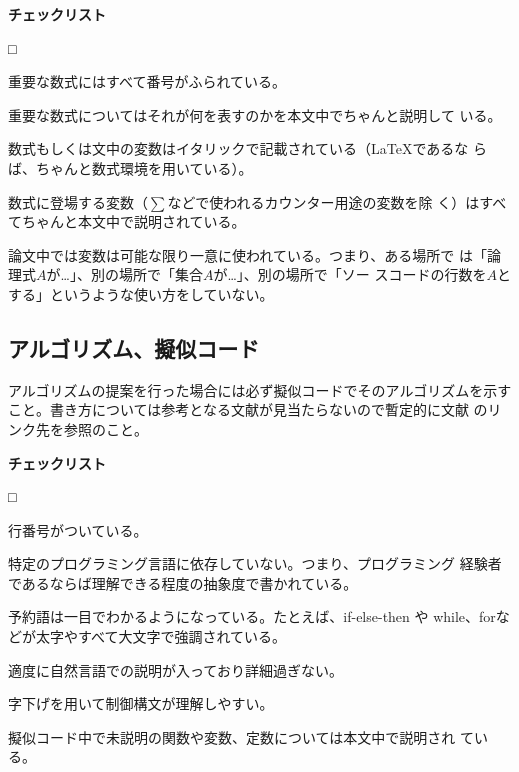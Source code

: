\documentclass[11pt,a4j]{jsarticle}
\begin{document}
\begin{flushleft}
 {\bf チェックリスト}
\end{flushleft}
\begin{list}%
 {□} %
 {} %
 \item 重要な数式にはすべて番号がふられている。
 \item 重要な数式についてはそれが何を表すのかを本文中でちゃんと説明して
       いる。
 \item 数式もしくは文中の変数はイタリックで記載されている（LaTeXであるな
       らば、ちゃんと数式環境を用いている）。
 \item 数式に登場する変数（$\sum$などで使われるカウンター用途の変数を除
       く）はすべてちゃんと本文中で説明されている。
 \item 論文中では変数は可能な限り一意に使われている。つまり、ある場所で
       は「論理式$A$が…」、別の場所で「集合$A$が…」、別の場所で「ソー
       スコードの行数を$A$とする」というような使い方をしていない。
 
\end{list}

\subsection{アルゴリズム、擬似コード}

アルゴリズムの提案を行った場合には必ず擬似コードでそのアルゴリズムを示す
こと。書き方については参考となる文献が見当たらないので暫定的に文献
\cite{Wikipedia.en_Psuedocode}のリンク先を参照のこと。

\begin{flushleft}
 {\bf チェックリスト}
\end{flushleft}
\begin{list}%
 {□} %
 {} %
 \item 行番号がついている。
 \item 特定のプログラミング言語に依存していない。つまり、プログラミング
       経験者であるならば理解できる程度の抽象度で書かれている。
 \item 予約語は一目でわかるようになっている。たとえば、if-else-then や
       while、forなどが太字やすべて大文字で強調されている。
 \item 適度に自然言語での説明が入っており詳細過ぎない。
 \item 字下げを用いて制御構文が理解しやすい。
 \item 擬似コード中で未説明の関数や変数、定数については本文中で説明され
       ている。
\end{list}
\end{document}

